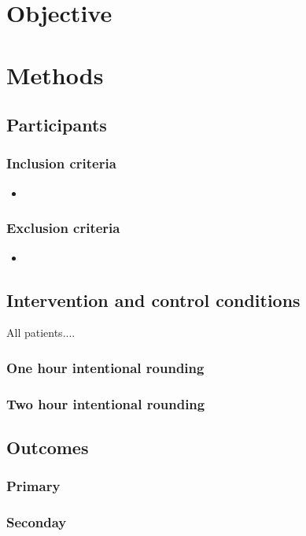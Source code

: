 \documentclass[12pt]{article}
\begin{document}
\section{Objective}


\section{Methods}
\subsection{Participants}
\subsubsection{Inclusion criteria}
\begin{itemize}
    \item 
\end{itemize}

\subsubsection{Exclusion criteria}
\begin{itemize}
    \item 
\end{itemize}

\subsection{Intervention and control conditions}
All patients....

\subsubsection{One hour intentional rounding}

\subsubsection{Two hour intentional rounding}

\subsection{Outcomes}

\subsubsection{Primary}

\subsubsection{Seconday}
\end{document}

